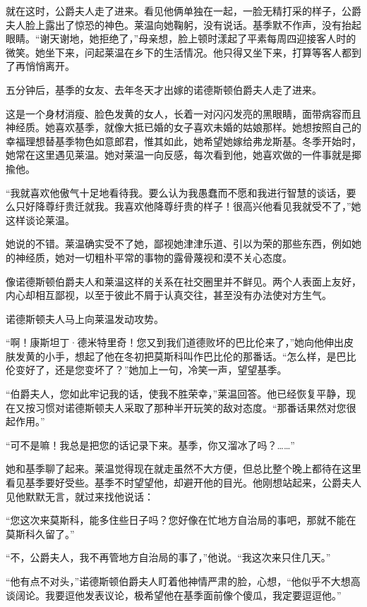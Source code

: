 \par 就在这时，公爵夫人走了进来。看见他俩单独在一起，一脸无精打采的样子，公爵夫人脸上露出了惊恐的神色。莱温向她鞠躬，没有说话。基季默不作声，没有抬起眼睛。“谢天谢地，她拒绝了，”母亲想，脸上顿时漾起了平素每周四迎接客人时的微笑。她坐下来，问起莱温在乡下的生活情况。他只得又坐下来，打算等客人都到了再悄悄离开。
\par 五分钟后，基季的女友、去年冬天才出嫁的诺德斯顿伯爵夫人走了进来。
\par 这是一个身材消瘦、脸色发黄的女人，长着一对闪闪发亮的黑眼睛，面带病容而且神经质。她喜欢基季，就像大抵已婚的女子喜欢未婚的姑娘那样。她想按照自己的幸福理想替基季物色如意郎君，惟其如此，她希望她嫁给弗龙斯基。冬季开始时，她常在这里遇见莱温。她对莱温一向反感，每次看到他，她喜欢做的一件事就是揶揄他。
\par “我就喜欢他傲气十足地看待我。要么认为我愚蠢而不愿和我进行智慧的谈话，要么只好降尊纡贵迁就我。我喜欢他降尊纡贵的样子！很高兴他看见我就受不了，”她这样谈论莱温。
\par 她说的不错。莱温确实受不了她，鄙视她津津乐道、引以为荣的那些东西，例如她的神经质，她对一切粗朴平常的事物的露骨蔑视和漠不关心态度。
\par 像诺德斯顿伯爵夫人和莱温这样的关系在社交圈里并不鲜见。两个人表面上友好，内心却相互鄙视，以至于彼此不屑于认真交往，甚至没有办法使对方生气。
\par 诺德斯顿夫人马上向莱温发动攻势。
\par “啊！康斯坦丁·德米特里奇！您又到我们道德败坏的巴比伦来了，”她向他伸出皮肤发黄的小手，想起了他在冬初把莫斯科叫作巴比伦的那番话。“怎么样，是巴比伦变好了，还是您变坏了？”她加上一句，冷笑一声，望望基季。
\par “伯爵夫人，您如此牢记我的话，使我不胜荣幸，”莱温回答。他已经恢复平静，现在又按习惯对诺德斯顿夫人采取了那种半开玩笑的敌对态度。“那番话果然对您很起作用。”
\par “可不是嘛！我总是把您的话记录下来。基季，你又溜冰了吗？……”
\par 她和基季聊了起来。莱温觉得现在就走虽然不大方便，但总比整个晚上都待在这里看见基季要好受些。基季不时望望他，却避开他的目光。他刚想站起来，公爵夫人见他默默无言，就过来找他说话：
\par “您这次来莫斯科，能多住些日子吗？您好像在忙地方自治局的事吧，那就不能在莫斯科久留了。”
\par “不，公爵夫人，我不再管地方自治局的事了，”他说。“我这次来只住几天。”
\par “他有点不对头，”诺德斯顿伯爵夫人盯着他神情严肃的脸，心想，“他似乎不大想高谈阔论。我要逗他发表议论，极希望他在基季面前像个傻瓜，我定要逗逗他。”
